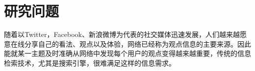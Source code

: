 %
%
%
%
%

\section{研究问题}
\label{point}
随着以Twitter，Facebook、新浪微博为代表的社交媒体迅速发展，人们越来越愿意在线分享自己的看法、观点以及体验，网络已经称为观点信息的主要来源。因此能就某一主题及时准确从网络中发现每个用户的观点变得越来越重要，传统的信息检索技术，尤其是搜索引擎，很难满足这样的信息需求。


